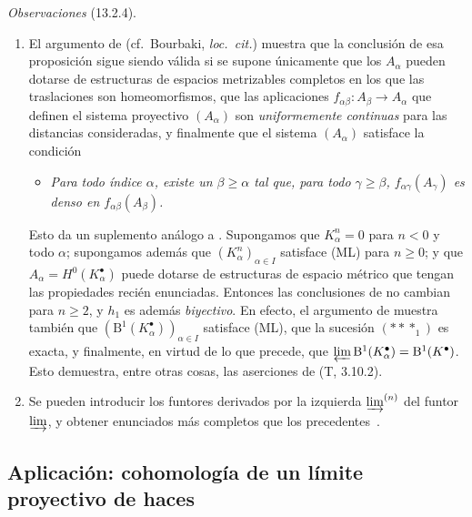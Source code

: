 \begin{env}[13.2.4]
\label{0.13.2.4}
\label{0.13.2.4-fr}
\emph{Observaciones} (13.2.4).
\begin{enumerate}
  \item[{\rm(i)}]
  El argumento de 
  (cf.\ Bourbaki, \emph{loc.\ cit.}) muestra que la conclusión de
  esa proposición sigue siendo válida si se supone únicamente que los
  $A_\alpha$ pueden dotarse de estructuras de espacios metrizables completos
  en los que las traslaciones son homeomorfismos, que las aplicaciones
  $f_{\alpha\beta}:A_\beta\to A_\alpha$ que definen el sistema proyectivo $(A_\alpha)$ son \emph{uniformemente continuas} para las distancias consideradas, y finalmente que el sistema $(A_\alpha)$ satisface la condición
  \begin{itemize}
    \item[(ML$'$)]
    \emph{Para todo índice $\alpha$, existe un $\beta\geq\alpha$ tal
    que, para todo $\gamma\geq\beta$,
    $f_{\alpha\gamma}(A_\gamma)$ es denso en
    $f_{\alpha\beta}(A_\beta)$.}
  \end{itemize}

  Esto da un suplemento análogo a .
  Supongamos que $K_\alpha^n=0$ para $n<0$ y todo $\alpha$; supongamos además que $(K_\alpha^n)_{\alpha\in I}$ satisface (ML) para
  $n\geq0$; y que
  $A_\alpha=H^0(K_\alpha^\bullet)$ puede dotarse de
  estructuras de espacio métrico que tengan las propiedades recién enunciadas.
  Entonces las conclusiones de  no cambian para
  $n\geq2$, y $h_1$ es además \emph{biyectivo}.
  En efecto, el argumento de  muestra también que
  $(\mathrm B^1(K_\alpha^\bullet))_{\alpha\in I}$
  satisface (ML), que la sucesión $(***_1)$ es exacta, y finalmente, en virtud de lo que precede, que $\varprojlim\mathrm B^1(K_\alpha^\bullet)=\mathrm B^1(K^\bullet)$.
  Esto demuestra, entre otras cosas, las aserciones de (T, 3.10.2).

  \item[{\rm(ii)}]
  Se pueden introducir los funtores derivados por la izquierda
  $\varinjlim^{(n)}$ del funtor $\varinjlim$, y obtener enunciados más
  completos que los precedentes~\cite{III-28}.
\end{enumerate}
\end{env}

\subsection{Aplicación: cohomología de un límite proyectivo de haces}
\label{subsection:0.13.3}
\label{subsection:0.13.3-fr}

